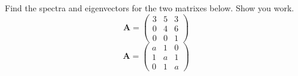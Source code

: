 Find the spectra and eigenvectors for the two matrixes below. Show you work.
\begin{equation*}\boldsymbol{A}=
	\begin{pmatrix}
		3&5&3\\0&4&6\\0&0&1
	\end{pmatrix}
\end{equation*}
\begin{equation*}
	\boldsymbol{A}=
	\begin{pmatrix}
		a&1&0\\1&a&1\\0&1&a
	\end{pmatrix}
\end{equation*}

